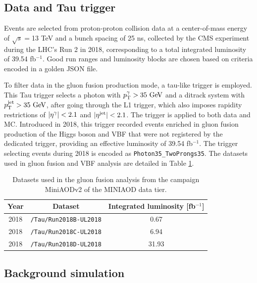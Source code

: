 \subsection{Data and Tau trigger}\label{subsec:data_tau_trigger}

Events are selected from proton-proton collision data at a center-of-mass energy of $\sqrt{s}=$13 TeV and a bunch spacing of 25 ns, collected by the CMS experiment during the LHC's Run 2 in 2018, corresponding to a total integrated luminosity of 39.54 fb$^{-1}$. Good run ranges and luminosity blocks are chosen based on criteria encoded in a golden JSON file.

To filter data in the gluon fusion production mode, a tau-like trigger is employed. This Tau trigger selects a photon with $p_\text{T}^{\gamma} > 35\ \text{GeV}$ and a ditrack system with $\pT^{\text{jet}} > 35\ \GeV$, after going through the L1 trigger, which also imposes rapidity restrictions of $\left\lvert\eta^{\gamma}\right\rvert<2.1$ and $\left\lvert\eta^{\text{jet}}\right\rvert<2.1$. The trigger is applied to both data and MC. Introduced in 2018, this trigger recorded events enriched in gluon fusion production of the Higgs boson and VBF that were not registered by the dedicated trigger, providing an effective luminosity of 39.54 fb$^{-1}$. The trigger selecting events during 2018 is encoded as \verb+Photon35_TwoProngs35+.  The datasets used in gluon fusion and VBF analysis are detailed in Table \ref{tab:ggH_datasets}.

\begin{table}[ht]
    \centering
    \begin{tabular}{|c|c|c|}
        \hline
        \multicolumn{1}{|c|}{\cellcolor{lightgray}Year} & \cellcolor{lightgray}Dataset & \cellcolor{lightgray}Integrated luminosity [fb$^{-1}$] \\ \hline
        2018    & \verb+/Tau/Run2018B-UL2018+  & 0.67 \\
        2018    & \verb+/Tau/Run2018C-UL2018+  & 6.94 \\
        2018    & \verb+/Tau/Run2018D-UL2018+  & 31.93 \\ \hline
    \end{tabular}
    \caption{Datasets used in the gluon fusion analysis from the campaign MiniAODv2 of the MINIAOD data tier.}
    \label{tab:ggH_datasets}
\end{table}

\subsection{Background simulation}

